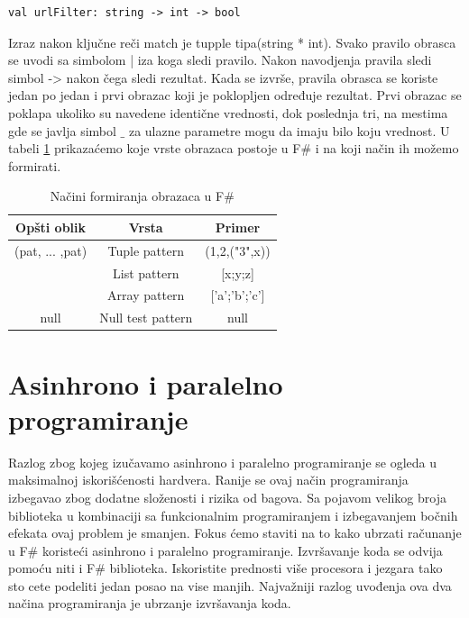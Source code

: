 \documentclass[a4paper]{article}
\begin{document}
\begin{lstlisting}
val urlFilter: string -> int -> bool
\end{lstlisting}

Izraz nakon ključne reči match je tupple tipa(string * int). Svako pravilo obrasca se uvodi sa simbolom | iza koga sledi pravilo. Nakon navodjenja pravila sledi simbol -> nakon čega sledi rezultat. Kada se izvrše, pravila obrasca se koriste jedan po jedan i prvi obrazac koji je poklopljen određuje rezultat. Prvi obrazac se poklapa ukoliko su navedene identične vrednosti, dok poslednja tri, na mestima gde se javlja simbol $\_$ za ulazne parametre mogu da imaju bilo koju vrednost. U tabeli \ref{tab:tabela1} prikazaćemo koje vrste obrazaca postoje u F\# i na koji način ih možemo formirati.
 
\begin{table}[h!]
\begin{center}
\caption{Načini formiranja obrazaca u F\#}
\begin{tabular}{|c|c|c|} \hline
Opšti oblik& Vrsta& Primer\\ \hline
(pat, ... ,pat) &Tuple pattern&(1,2,("3",x))
\\ \hline
[pat, ... ,pat] &List pattern&[x;y;z]\\ \hline
[|pat, ... ,pat|] &Array pattern&['a';'b';'c']\\ \hline
null &Null test pattern&null\\ \hline
\end{tabular}
\label{tab:tabela1}
\end{center}
\end{table}


\section{Asinhrono i paralelno programiranje}

Razlog zbog kojeg izučavamo asinhrono i paralelno programiranje se ogleda u maksimalnoj iskorišćenosti hardvera. Ranije se ovaj način programiranja izbegavao zbog dodatne složenosti i rizika od bagova. Sa pojavom velikog broja biblioteka u kombinaciji sa funkcionalnim programiranjem i izbegavanjem bočnih efekata ovaj problem je smanjen. Fokus ćemo staviti na to kako ubrzati računanje u F\# koristeći asinhrono i paralelno programiranje. Izvršavanje koda se odvija pomoću niti i F\# biblioteka. 
Iskoristite prednosti više procesora i jezgara tako sto cete podeliti jedan posao na vise manjih. Najvažniji razlog uvođenja ova dva načina programiranja je ubrzanje izvršavanja koda.
\end{document}
